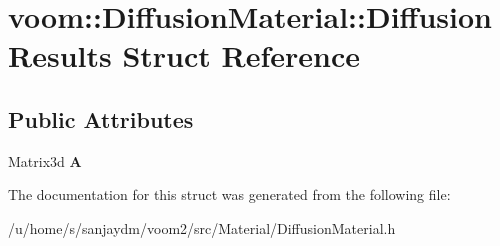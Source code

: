 \hypertarget{structvoom_1_1_diffusion_material_1_1_diffusion_results}{
\section{voom::DiffusionMaterial::DiffusionResults Struct Reference}
\label{structvoom_1_1_diffusion_material_1_1_diffusion_results}
}
\subsection*{Public Attributes}
\begin{DoxyCompactItemize}
\item 
\hypertarget{structvoom_1_1_diffusion_material_1_1_diffusion_results_afa2d64a8150db30a6f16b468159d20c1}{
Matrix3d {\bfseries A}}
\label{structvoom_1_1_diffusion_material_1_1_diffusion_results_afa2d64a8150db30a6f16b468159d20c1}

\end{DoxyCompactItemize}


The documentation for this struct was generated from the following file:\begin{DoxyCompactItemize}
\item 
/u/home/s/sanjaydm/voom2/src/Material/DiffusionMaterial.h\end{DoxyCompactItemize}
